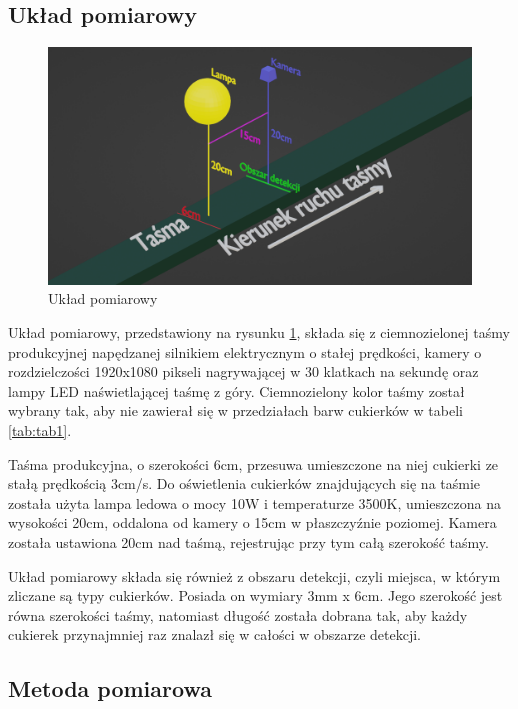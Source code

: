 \documentclass{article}
\begin{document}
\subsection{Układ pomiarowy}
\label{Układ pomiarowy}

\begin{figure}[H]
    \centering
    \includegraphics[width=\linewidth]{ukladPomiarowy.png}
    \caption{Układ pomiarowy}
    \label{fig:ukladPomiarowy}
\end{figure}

Układ pomiarowy, przedstawiony na rysunku \ref{fig:ukladPomiarowy}, składa się z ciemnozielonej taśmy produkcyjnej napędzanej silnikiem elektrycznym o stałej prędkości, kamery o rozdzielczości 1920x1080 pikseli nagrywającej w 30 klatkach na sekundę oraz lampy LED naświetlającej taśmę z góry. Ciemnozielony kolor taśmy został wybrany tak, aby nie zawierał się w przedziałach barw cukierków w tabeli \ref{tab:tab1}.

Taśma produkcyjna, o szerokości 6cm, przesuwa umieszczone na niej cukierki ze stałą prędkością 3cm/s. Do oświetlenia cukierków znajdujących się na taśmie została użyta lampa ledowa o mocy 10W i temperaturze 3500K, umieszczona na wysokości 20cm, oddalona od kamery o 15cm w płaszczyźnie poziomej. Kamera została ustawiona 20cm nad taśmą, rejestrując przy tym całą szerokość taśmy.

Układ pomiarowy składa się również z obszaru detekcji, czyli miejsca, w którym zliczane są typy cukierków. Posiada on wymiary 3mm x 6cm. Jego szerokość jest równa szerokości taśmy, natomiast długość została dobrana tak, aby każdy cukierek przynajmniej raz znalazł się w całości w obszarze detekcji.

\subsection{Metoda pomiarowa}
\label{Metoda pomiarowa}
\end{document}
